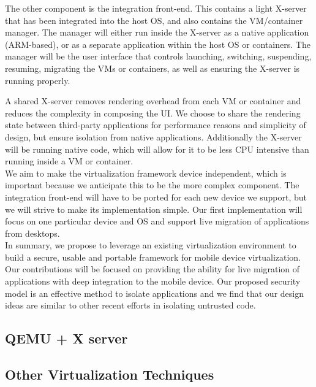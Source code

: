 The other component is the integration front-end.  This contains a light X-server that has been integrated into the host OS, and also contains the VM/container manager.  The manager will either run inside the X-server as a native application (ARM-based), or as a separate application within the host OS or containers.  The manager will be the user interface that controls launching, switching, suspending, resuming, migrating the VMs or containers, as well as ensuring the X-server is running properly. %

A shared X-server removes rendering overhead from each VM or container and reduces the complexity in composing the UI. We choose to share the rendering state between third-party applications for performance reasons and simplicity of design, but ensure isolation from native applications.  Additionally the X-server will be running native code, which will allow for it to be less CPU intensive than running inside a VM or container. \\

We aim to make the virtualization framework device independent, which is important because we anticipate this to be the more complex component.  The integration front-end will have to be ported for each new device we support, but we will strive to make its implementation simple. Our first implementation will focus on one particular device and OS and support live migration of applications from desktops. \\

In summary, we propose to leverage an existing virtualization environment to build a secure, usable and portable framework for mobile device virtualization. Our contributions will be focused on providing the ability for live migration of applications with deep integration to the mobile device. Our proposed security model is an effective method to isolate applications and we find that our design ideas are similar to other recent efforts \cite{grier2008secure} in isolating untrusted code.

\subsection{QEMU + X server}
\subsection{Other Virtualization Techniques}
